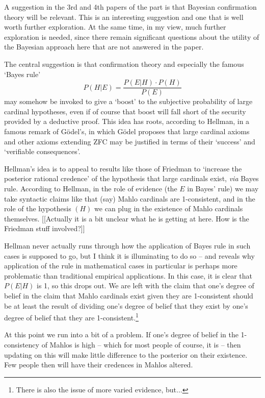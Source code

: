 \documentclass{asl}
\theoremstyle{definition}
\begin{document}
A suggestion in the 3rd and 4th papers of the part is that Bayesian confirmation theory will be relevant. This is an interesting suggestion and one that is well worth further exploration. At the same time, in my view, much further exploration is needed, since there remain significant questions about the utility of the Bayesian approach here that are not answered in the paper.

The central suggestion is that confirmation theory and especially the famous `Bayes rule'
\begin{equation}
P(H|E) = \frac{P(E|H)\cdot P(H)}{P(E)}
\end{equation}
may somehow be invoked to give a `boost' to the subjective probability of large cardinal hypotheses, even if of course that boost will fall short of the security provided by a deductive proof. This idea has roots, according to Hellman, in a famous remark of G\"odel's, in which G\"odel proposes that large cardinal axioms and other axioms extending ZFC may be justified in terms of their `success' and `verifiable consequences'.

Hellman's idea is to appeal to results like those of Friedman to `increase the posterior rational credence' of the hypothesis that large cardinals exist, \emph{via}  Bayes rule. According to Hellman, in the role of evidence (the $E$ in Bayes' rule) we may take syntactic claims like that (say) Mahlo cardinals are 1-consistent, and in the role of the hypothesis  $(H)$ we can plug in the existence of Mahlo cardinals themselves. [[Actually it is a bit unclear what he is getting at here. How is the Friedman stuff involved?]]

Hellman never actually runs through how the application of Bayes rule in such cases is supposed to go, but I think it is illuminating to do so -- and reveals why application of the rule in mathematical cases in particular is perhaps more problematic than traditional empirical applications. In this case, it is clear that $P(E|H)$ is 1, so this drops out. We are left with the claim that one's degree of belief in the claim that Mahlo cardinals exist given they are 1-consistent should be at least the result of dividing one's degree of belief that they exist by one's degree of belief that they are 1-consistent.\footnote{There is also the issue of more varied evidence, but...}

At this point we run into a bit of a problem. If one's degree of belief in the 1-consistency of Mahlos is high -- which for most people of course, it is -- then updating on this will make little difference to the posterior on their existence. Few people then will have their credences in Mahlos altered.
\end{document}
